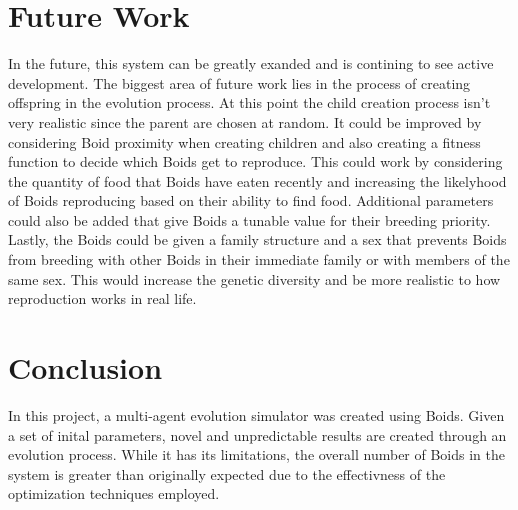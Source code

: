 \documentclass{egpubl}
\begin{document}
\section{Future Work}
In the future, this system can be greatly exanded and is contining to see active development. The biggest area of future work lies in the process of creating offspring in the evolution process. At this point the child creation process isn't very realistic since the parent are chosen at random. It could be improved by considering Boid proximity when creating children and also creating a fitness function to decide which Boids get to reproduce. This could work by considering the quantity of food that Boids have eaten recently and increasing the likelyhood of Boids reproducing based on their ability to find food. Additional parameters could also be added that give Boids a tunable value for their breeding priority. Lastly, the Boids could be given a family structure and a sex that prevents Boids from breeding with other Boids in their immediate family or with members of the same sex. This would increase the genetic diversity and be more realistic to how reproduction works in real life. 
\section{Conclusion}
In this project, a multi-agent evolution simulator was created using Boids. Given a set of inital parameters, novel and unpredictable results are created through an evolution process. While it has its limitations, the overall number of Boids in the system is greater than originally expected due to the effectivness of the optimization techniques employed.
\printbibliography                
\end{document}
